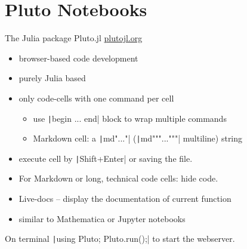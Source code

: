 \documentclass[aspectratio=169, 12pt]{beamer}
\begin{document}
    \section{Pluto Notebooks}
    \begin{frame}[fragile]{The Julia package Pluto.jl}
        \hfill\href{https://plutojl.org}{plutojl.org}
        \begin{itemize}
            \item browser-based code development
            \item purely Julia based
            \pause
            \item only code-cells with \alert{one} command per cell
            \begin{itemize}
                \item use \texttt|begin ... end| block to wrap multiple commands
                \item Markdown cell: a \texttt|md"..."| (\texttt|md"""..."""| multiline) string
            \end{itemize}
            \item execute cell by \texttt|Shift+Enter| or saving the file.
            \pause
            \item For Markdown or long, technical code cells: hide code.
            \pause
            \item Live-docs – display the documentation of current function
            \pause
            \item similar to Mathematica or Jupyter notebooks
        \end{itemize}
        On terminal \texttt|using Pluto; Pluto.run();| to start the webserver.
    \end{frame}
\end{document}
